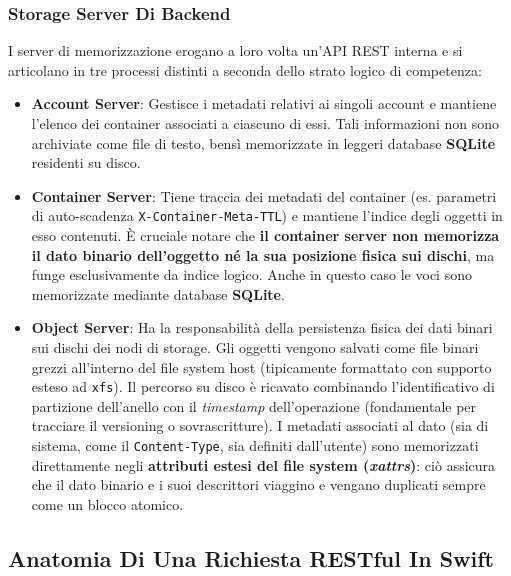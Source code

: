 \documentclass[11pt, a4paper]{article}
\begin{document}
\subsubsection{Storage Server Di Backend}
I server di memorizzazione erogano a loro volta un'API REST interna e si articolano in tre processi distinti a seconda dello strato logico di competenza:
\begin{itemize}
    \item \textbf{Account Server}: Gestisce i metadati relativi ai singoli account e mantiene l'elenco dei container associati a ciascuno di essi. Tali informazioni non sono archiviate come file di testo, bensì memorizzate in leggeri database \textbf{SQLite} residenti su disco.
    \item \textbf{Container Server}: Tiene traccia dei metadati del container (es. parametri di auto-scadenza \texttt{X-Container-Meta-TTL}) e mantiene l'indice degli oggetti in esso contenuti. \`E cruciale notare che \textbf{il container server non memorizza il dato binario dell'oggetto né la sua posizione fisica sui dischi}, ma funge esclusivamente da indice logico. Anche in questo caso le voci sono memorizzate mediante database \textbf{SQLite}.
    \item \textbf{Object Server}: Ha la responsabilità della persistenza fisica dei dati binari sui dischi dei nodi di storage. Gli oggetti vengono salvati come file binari grezzi all'interno del file system host (tipicamente formattato con supporto esteso ad \texttt{xfs}). Il percorso su disco è ricavato combinando l'identificativo di partizione dell'anello con il \emph{timestamp} dell'operazione (fondamentale per tracciare il versioning o sovrascritture). I metadati associati al dato (sia di sistema, come il \texttt{Content-Type}, sia definiti dall'utente) sono memorizzati direttamente negli \textbf{attributi estesi del file system (\emph{xattrs})}: ciò assicura che il dato binario e i suoi descrittori viaggino e vengano duplicati sempre come un blocco atomico.
\end{itemize}

\subsection{Anatomia Di Una Richiesta RESTful In Swift}
\end{document}
